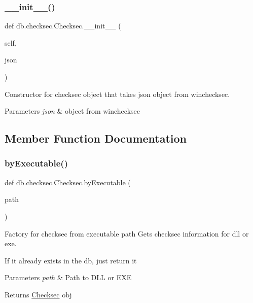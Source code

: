 \subsubsection{\texorpdfstring{\+\_\+\+\_\+init\+\_\+\+\_\+()}{\_\_init\_\_()}}
{\footnotesize\ttfamily def db.\+checksec.\+Checksec.\+\_\+\+\_\+init\+\_\+\+\_\+ (\begin{DoxyParamCaption}\item[{}]{self,  }\item[{}]{json }\end{DoxyParamCaption})}



Constructor for checksec object that takes json object from winchecksec. 


\begin{DoxyParams}{Parameters}
{\em json} & object from winchecksec \\
\hline
\end{DoxyParams}


\subsection{Member Function Documentation}
\mbox{\label{classdb_1_1checksec_1_1_checksec_a25d2a8573c852b4610dda6899f60932e}} 
\subsubsection{\texorpdfstring{by\+Executable()}{byExecutable()}}
{\footnotesize\ttfamily def db.\+checksec.\+Checksec.\+by\+Executable (\begin{DoxyParamCaption}\item[{}]{path }\end{DoxyParamCaption})\hspace{0.3cm}{\ttfamily [static]}}



Factory for checksec from executable path Gets checksec information for dll or exe. 

If it already exists in the db, just return it 
\begin{DoxyParams}{Parameters}
{\em path} & Path to D\+LL or E\+XE \\
\hline
\end{DoxyParams}
\begin{DoxyReturn}{Returns}
\mbox{\hyperlink{classdb_1_1checksec_1_1_checksec}{Checksec}} obj 
\end{DoxyReturn}
\mbox{\label{classdb_1_1checksec_1_1_checksec_aac7a0cd7ad46ba754f4773555da84fd3}} 
